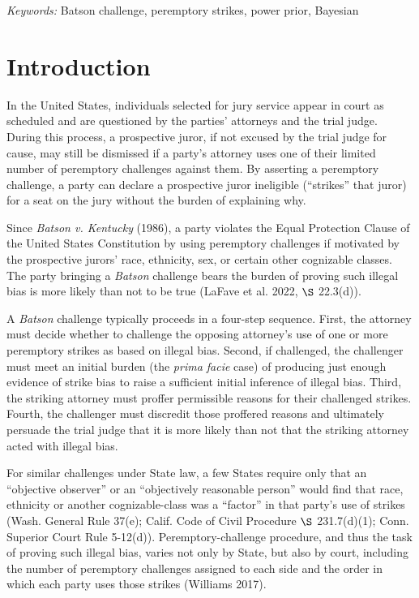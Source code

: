 \documentclass[12pt]{article}
\begin{document}
\noindent%
{\it Keywords:} Batson challenge, peremptory strikes, power prior, Bayesian

\vfill

\newpage
{} %

\hypertarget{introduction}{%
\section{Introduction}\label{introduction}}

In the United States, individuals selected for jury service appear in court as scheduled and are questioned by the parties' attorneys and the trial judge. During this process, a prospective juror, if not excused by the trial judge for cause, may still be dismissed if a party's attorney uses one of their limited number of peremptory challenges against them. By asserting a peremptory challenge, a party can declare a prospective juror ineligible (``strikes'' that juror) for a seat on the jury without the burden of explaining why.

Since \emph{Batson v. Kentucky} (1986), a party violates the Equal Protection Clause of the United States Constitution by using peremptory challenges if motivated by the prospective jurors' race, ethnicity, sex, or certain other cognizable classes. The party bringing a \emph{Batson} challenge bears the burden of proving such illegal bias is more likely than not to be true (LaFave et al. 2022, \(\S\) 22.3(d)).

A \emph{Batson} challenge typically proceeds in a four-step sequence. First, the attorney must decide whether to challenge the opposing attorney's use of one or more peremptory strikes as based on illegal bias. Second, if challenged, the challenger must meet an initial burden (the \emph{prima facie} case) of producing just enough evidence of strike bias to raise a sufficient initial inference of illegal bias. Third, the striking attorney must proffer permissible reasons for their challenged strikes. Fourth, the challenger must discredit those proffered reasons and ultimately persuade the trial judge that it is more likely than not that the striking attorney acted with illegal bias.

For similar challenges under State law, a few States require only that an ``objective observer'' or an ``objectively reasonable person'' would find that race, ethnicity or another cognizable-class was a ``factor'' in that party's use of strikes (Wash. General Rule 37(e); Calif. Code of Civil Procedure \(\S\) 231.7(d)(1); Conn. Superior Court Rule 5-12(d)). Peremptory-challenge procedure, and thus the task of proving such illegal bias, varies not only by State, but also by court, including the number of peremptory challenges assigned to each side and the order in which each party uses those strikes (Williams 2017).
\end{document}
